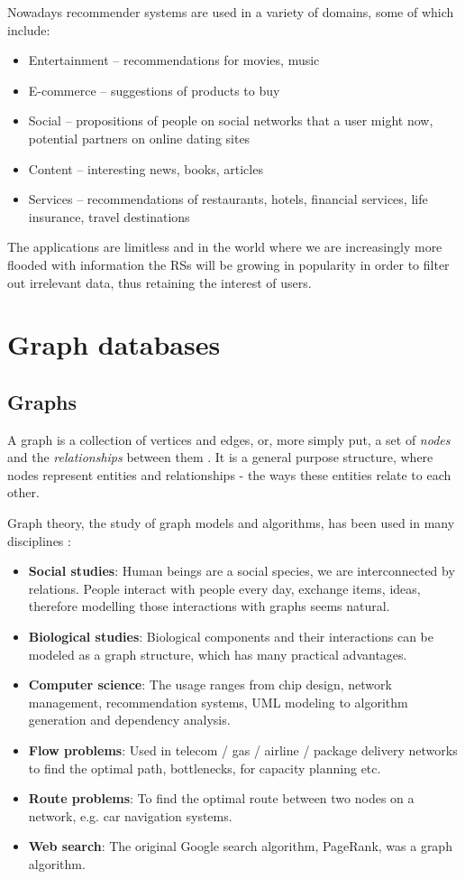 \documentclass[12pt]{report}
\begin{document}
Nowadays recommender systems are used in a variety of domains, some of which include:
\begin{itemize}
\item Entertainment -- recommendations for movies, music
\item E-commerce -- suggestions of products to buy
\item Social -- propositions of people on social networks that a user might now, potential partners on online dating sites
\item Content -- interesting news, books, articles
\item Services -- recommendations of restaurants, hotels, financial services, life insurance, travel destinations
\end{itemize}

The applications are limitless and in the world where we are increasingly more flooded with information the RSs will be growing in popularity in order to filter out irrelevant data, thus retaining the interest of users.

\section{Graph databases}

\subsection{Graphs}

A graph is a collection of vertices and edges, or, more simply put, a set of \textit{nodes} and the \textit{relationships} between them \cite{graph_databases}. It is a general purpose structure, where nodes represent entities and relationships - the ways these entities relate to each other.

Graph theory, the study of graph models and algorithms, has been used in many disciplines \cite{learning_neo4j}:
\begin{itemize}
\item {\bf Social studies}: Human beings are a social species, we are interconnected by relations. People interact with people every day, exchange items, ideas, therefore modelling those interactions with graphs seems natural.
\item {\bf Biological studies}: Biological components and their interactions can be modeled as a graph structure, which has many practical advantages.
\item {\bf Computer science}: The usage ranges from chip design, network management, recommendation systems, UML modeling to algorithm generation and dependency analysis.
\item {\bf Flow problems}: Used in telecom / gas / airline / package delivery networks to find the optimal path, bottlenecks, for capacity planning etc. 
\item {\bf Route problems}: To find the optimal route between two nodes on a network, e.g. car navigation systems.
\item {\bf Web search}: The original Google search algorithm, PageRank, was a graph algorithm.
\end{itemize}
\end{document}
